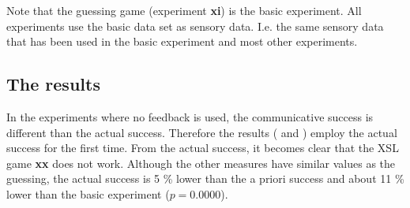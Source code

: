 Note that the guessing game (experiment {\bf xi}) is the basic experiment. All experiments use the basic data set as sensory data. I.e. the same sensory data that has been used in the basic experiment and most other experiments.

\subsection{The results}


In the experiments where no feedback is used, the communicative success is different than the actual success. Therefore the results ( and ) employ the actual success for the first time. From the actual success, it becomes clear that the XSL game {\bf xx} does not work. Although the other measures have similar values as the guessing, the actual success is 5 \% lower than the a priori success and about 11 \% lower than the basic experiment ($p=0.0000$).

